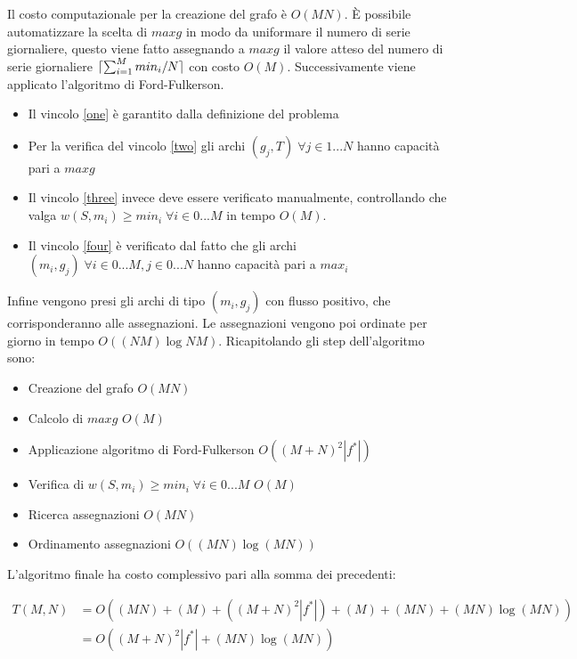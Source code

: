 \documentclass{article}
\DeclarePairedDelimiter\ceil{\lceil}{\rceil}
\begin{document}
Il costo computazionale per la creazione del grafo è $O(MN)$.
È possibile automatizzare la scelta di $maxg$ in modo da uniformare il numero di
serie giornaliere, questo viene fatto assegnando a $maxg$ il valore atteso del
numero di serie giornaliere $\ceil{\sum_{i=1}^Mmin_i / N}$ con costo
$O(M)$.
Successivamente viene applicato l'algoritmo di Ford-Fulkerson.
\begin{itemize}
    \item Il vincolo \ref{one} è garantito dalla definizione del problema
    \item Per la verifica del vincolo \ref{two} gli archi
    $(g_j, T) \; \forall j \in 1...N$ hanno capacità pari a $maxg$
    \item Il vincolo \ref{three} invece deve essere verificato manualmente,
    controllando che valga $w(S, m_i) \geq min_i \; \forall i \in 0...M$ in
    tempo $O(M)$.
    \item Il vincolo \ref{four} è verificato dal fatto che gli archi
    $(m_i, g_j) \; \forall i \in 0...M, j \in 0...N$ hanno capacità pari a
    $max_i$
\end{itemize}
Infine vengono presi gli archi di tipo $(m_i, g_j)$ con flusso positivo, che
corrisponderanno alle assegnazioni. Le assegnazioni vengono poi ordinate per
giorno in tempo $O((NM) \log NM)$.
Ricapitolando gli step dell'algoritmo sono:
\begin{itemize}
    \item Creazione del grafo $O(MN)$
    \item Calcolo di $maxg$ $O(M)$
    \item Applicazione algoritmo di Ford-Fulkerson $O((M + N)^2 |f^*|)$
    \item Verifica di $w(S, m_i) \geq min_i \; \forall i \in 0...M$ $O(M)$
    \item Ricerca assegnazioni $O(MN)$
    \item Ordinamento assegnazioni $O((MN) \log (MN))$
\end{itemize}
L'algoritmo finale ha costo complessivo pari alla somma dei precedenti:

\begin{equation*}
\begin{split}
    T(M, N) &= O((MN) + (M) + ((M+N)^2 |f^*|) + (M) + (MN) + (MN) \log (MN)) \\
            &= \boxed{O((M+N)^2 |f^*| + (MN) \log (MN))} \\
\end{split}
\end{equation*}
\end{document}
